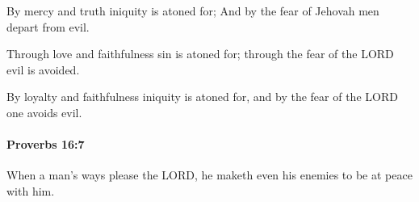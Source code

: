 			\begin{versebox}
					\item[BHS] 
					\item[ASV] By mercy and truth iniquity is atoned for; And by the fear of Jehovah men depart from evil.
					\item[NIV] Through love and faithfulness sin is atoned for; through the fear of the LORD evil is avoided.
					\item[NRSV] By loyalty and faithfulness iniquity is atoned for, and by the fear of the LORD one avoids evil.
			\end{versebox}

		\paragraph{Proverbs 16:7} %
			\label{PROVERBS-16-7}

			When a man’s ways please the LORD, he maketh even his enemies to be at peace with him.

